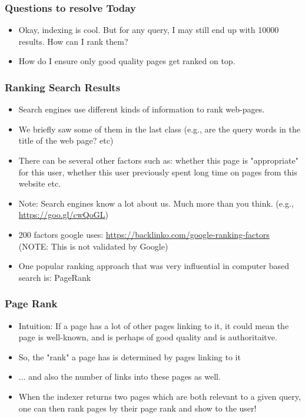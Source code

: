 \documentclass{beamer}
\begin{document}
\begin{frame}
\frametitle{Questions to resolve Today}
\begin{itemize}
\item Okay, indexing is cool. But for any query, I may still end up with 10000 results. How can I rank them?
\item How do I ensure only good quality pages get ranked on top. 
\end{itemize}
\end{frame}

\begin{frame}
\frametitle{Ranking Search Results}
\begin{itemize}
\item Search engines use different kinds of information to rank web-pages. 
\item We briefly saw some of them in the last class (e.g., are the query words in the title of the web page? etc)
\item There can be several other factors such as: whether this page is "appropriate" for this user, whether this user previously spent long time on pages from this website etc. \pause
\item Note: Search engines know a lot about us. Much more than you think. (e.g., \url{https://goo.gl/cwQoGL})
\item 200 factors google uses: \url{https://backlinko.com/google-ranking-factors} (NOTE: This is not validated by Google) \pause
\item One popular ranking approach that was very influential in computer based search is: PageRank
\end{itemize}
\end{frame}

\begin{frame}
\frametitle{Page Rank}
\begin{itemize}
\item Intuition: If a page has a lot of other pages linking to it, it could mean the page is well-known, and is perhaps of good quality and is authoritaitve.
\item So, the "rank" a page has is determined by pages linking to it
\item ... and also the number of links into these pages as well. \pause
\item When the indexer returns two pages which are both relevant to a given query, one can then rank pages by their page rank and show to the user!
\end{itemize}
\end{frame}
\end{document}
